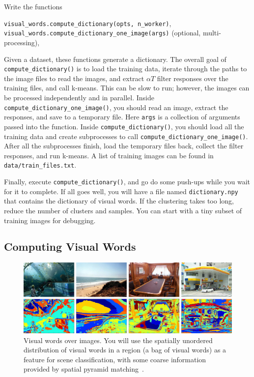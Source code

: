 \documentclass[10pt]{article}
\makeatletter
\DeclareRobustCommand\onedot{\futurelet\@let@token\@onedot}
\def\@onedot{\ifx\@let@token.\else.\null\fi\xspace}
\def\ie{\emph{i.e}\onedot} \def\Ie{\emph{I.e}\onedot}
\makeatother
\begin{document}

\par {}
Write the functions
\begin{center}
  {\tt visual\_words.compute\_dictionary(opts, n\_worker)}, \\
  {\tt visual\_words.compute\_dictionary\_one\_image(args)} (optional, multi-processing),
\end{center}
Given a dataset, these functions generate a dictionary. 
The overall goal of {\tt compute\_dictionary()} is to load the training data, iterate through the paths to the image files to read the images, and extract $\alpha T$ filter responses over the training files, and call k-means.
This can be slow to run; however, the images can be processed independently and in parallel.
Inside {\tt compute\_dictionary\_one\_image()}, you should read an image, extract the responses, and save to a temporary file. Here {\tt args} is a collection of arguments passed into the function.
Inside {\tt compute\_dictionary()}, you should load all the training data and create subprocesses to call {\tt compute\_dictionary\_one\_image()}.
After all the subprocesses finish, load the temporary files back, collect the filter responses, and run k-means. A list of training images can be found in {\tt data/train\_files.txt}.

Finally, execute {\tt compute\_dictionary()}, and go do some push-ups while you wait for it to complete. 
If all goes well, you will have a file named {\tt dictionary.npy} that contains the dictionary of visual words. 
If the clustering takes too long, reduce the number of clusters and samples. You can start with a tiny subset of training images for debugging.

\subsection{Computing Visual Words}

\begin{figure}[h]
  \centering
  \includegraphics[width=\textwidth]{./figures/textons.jpg}
  \caption{Visual words over images. You will use the spatially unordered
    distribution of visual words in a region (a bag of visual words) as a
    feature for scene classification, with some coarse information provided by
    spatial pyramid matching~\cite{1641019}.}
  \label{fig:textons}
\end{figure}
\end{document}
